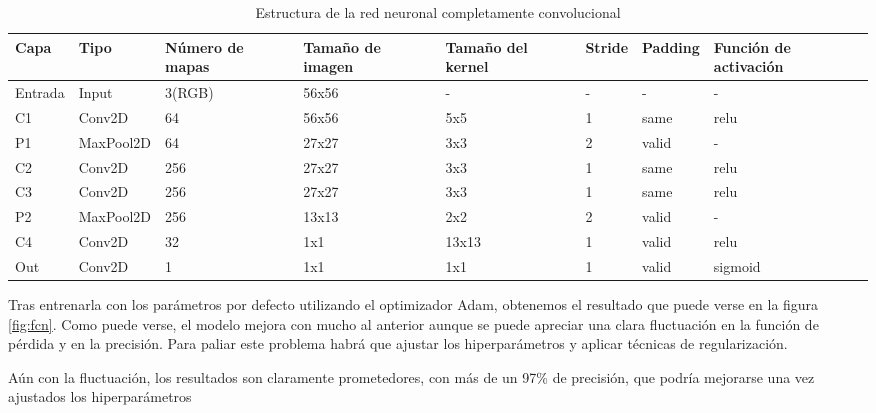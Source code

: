 \begin{table}[h]
  \centering
  \begin{tabular}{|l|l|p{1.4cm}|p{1.4cm}|p{1.5cm}|l|l|p{1.4cm}|}
    \hline
    Capa    & Tipo      & Número de mapas & Tamaño de imagen & Tamaño del kernel & Stride & Padding & Función de activación \\ \hline
    Entrada & Input     & 3(RGB)          & 56x56            & -                 & -      & -       & -                     \\ \hline
    C1      & Conv2D    & 64              & 56x56            & 5x5               & 1      & same    & relu                  \\ \hline
    P1      & MaxPool2D & 64              & 27x27            & 3x3               & 2      & valid   & -                     \\ \hline
    C2      & Conv2D    & 256             & 27x27            & 3x3               & 1      & same    & relu                  \\ \hline
    C3      & Conv2D    & 256             & 27x27            & 3x3               & 1      & same    & relu                  \\ \hline
    P2      & MaxPool2D & 256             & 13x13            & 2x2               & 2      & valid   & -                     \\ \hline
    C4      & Conv2D    & 32              & 1x1              & 13x13             & 1      & valid   & relu                  \\ \hline
    Out     & Conv2D    & 1               & 1x1              & 1x1               & 1      & valid   & sigmoid               \\ \hline
  \end{tabular}
  \caption{Estructura de la red neuronal completamente convolucional}
  \label{tabla:fcn}
\end{table}

Tras entrenarla con los parámetros por defecto utilizando el optimizador Adam, obtenemos el resultado que puede verse en la figura \ref{fig:fcn}. Como puede verse, el modelo mejora con mucho al anterior aunque se puede apreciar una clara fluctuación en la función de pérdida y en la precisión. Para paliar este problema habrá que ajustar los hiperparámetros y aplicar técnicas de regularización.

Aún con la fluctuación, los resultados son claramente prometedores, con más de un 97\% de precisión, que podría mejorarse una vez ajustados los hiperparámetros

